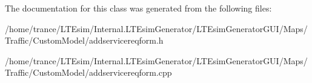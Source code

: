 The documentation for this class was generated from the following files\+:\begin{DoxyCompactItemize}
\item 
/home/trance/\+L\+T\+Esim/\+Internal.\+L\+T\+Esim\+Generator/\+L\+T\+Esim\+Generator\+G\+U\+I/\+Maps/\+Traffic/\+Custom\+Model/addservicereqform.\+h\item 
/home/trance/\+L\+T\+Esim/\+Internal.\+L\+T\+Esim\+Generator/\+L\+T\+Esim\+Generator\+G\+U\+I/\+Maps/\+Traffic/\+Custom\+Model/addservicereqform.\+cpp\end{DoxyCompactItemize}
